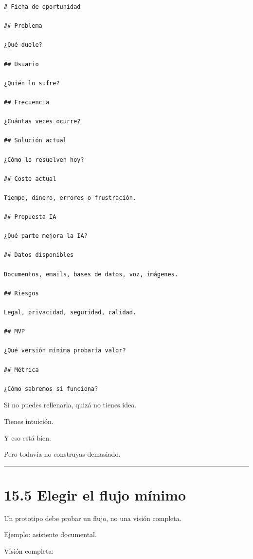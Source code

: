 \begin{lstlisting}
# Ficha de oportunidad

## Problema

¿Qué duele?

## Usuario

¿Quién lo sufre?

## Frecuencia

¿Cuántas veces ocurre?

## Solución actual

¿Cómo lo resuelven hoy?

## Coste actual

Tiempo, dinero, errores o frustración.

## Propuesta IA

¿Qué parte mejora la IA?

## Datos disponibles

Documentos, emails, bases de datos, voz, imágenes.

## Riesgos

Legal, privacidad, seguridad, calidad.

## MVP

¿Qué versión mínima probaría valor?

## Métrica

¿Cómo sabremos si funciona?
\end{lstlisting}

Si no puedes rellenarla, quizá no tienes idea.

Tienes intuición.

Y eso está bien.

Pero todavía no construyas demasiado.

\begin{center}\rule{0.5\linewidth}{0.5pt}\end{center}

\section{15.5 Elegir el flujo mínimo}\label{elegir-el-flujo-muxednimo}

Un prototipo debe probar un flujo, no una visión completa.

Ejemplo: asistente documental.

Visión completa:


